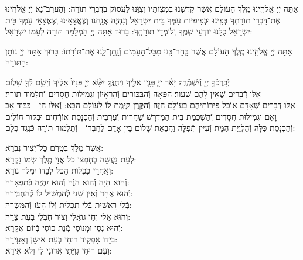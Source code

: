 \documentclass[twoside, openany, parskip=half, 11pt]{book}
\begin{document}
אַתָּה יְיָ אֱלֹהֵֽינוּ מֶֽלֶךְ הָעוֹלָם אֲשֶׁר קִדְּֿשָֽֿׁנוּ בְּֿמִצְוֹתָיו וְֿצִוָּֽנוּ לַעֲסוֹק בְּֿדִבְרֵי תוֹרָה: וְֿהַעֲרֶב־נָא יְיָ אֱלֹהֵֽינוּ אֶת־דִּבְרֵי תוֹרָתְֿךָ בְּֿפִֽינוּ וּבְפִיפִיּוֹת עַמְּֿךָ בֵּית יִשְׂרָאֵל וְֿנִהְיֶה אֲנַֽחְנוּ וְֿצֶאֱצָאֵֽינוּ וְֿצֶאֱצָאֵי עַמְּֿךָ בֵּית יִשְׂרָאֵל כֻּלָּֽנוּ יוֹדְֿעֵי שְֿׁמֶֽךָ וְֿלוֹמְֿדֵי תוֹרָתֶֽךָ: בָּרוּךְ אַתָּה יְיָ הַמְֿלַמֵּד תּוֹרָה לְֿעַמּוֹ יִשְׂרָאֵל:

אַתָּה יְיָ אֱלֹהֵֽינוּ מֶֽלֶךְ הָעוֹלָם אֲשֶׁר בָּֽחַר־בָּֽנוּ מִכׇּל־הָעַמִּים וְֿנָֽתַן־לָֽנוּ אֶת־תּוֹרָתוֹ: בָּרוּךְ אַתָּה יְיָ נוֹתֵן הַתּוֹרָה:



יְֿבָֽרֶכְֿךָ֥ יְיָ֖ וְֿיִשְׁמְֿרֶֽךָ׃ יָאֵ֨ר יְיָ֧ פָּנָ֛יו אֵלֶ֖יךָ וִֽיחֻנֶּֽךָּ׃ יִשָּׂ֨א יְיָ֤ פָּנָיו֙ אֵלֶ֔יךָ וְֿיָשֵׂ֥ם לְֿךָ֖ שָׁלֽוֹם׃\\
אֵֽלּוּ דְֿבָרִים שֶׁאֵין לָהֶם שִׁעוּר׃ הַפֵּאָה וְֿהַבִּכּוּרִים וְֿהָרֵאָיוֹן וּגְמִילוּת חֲסָדִים וְֿתַלְמוּד תּוֹרָה׃\\
אֵֽלּוּ דְבָרִים שֶׁאָדָם אוֹכֵל פֵּירוֹתֵיהֶם בָּעוֹלָם הַזֶּה וְֿהַקֶּֽרֶן קַיֶּֽמֶת לוֹ לָעוֹלָם הַבָּא: וְֿאֵֽלּוּ הֵן - כִּבּוּד אָב וָאֵם וּגְמִילוּת חֲסָדִים וְֿהַשְׁכָּמַת בֵּית הַמִּדְרָשׁ שַׁחֲרִית וְֿעַרְבִית וְֿהַכְנָסַת אוֹרְֿחִים וּבִקּוּר חוֹלִים וְֿהַכְנָסַת כַּלָּה וְֿהַלְוָיַת הַמֵּת וְֿעִיּוּן תְּֿפִלָּה וַהֲבָאַת שָׁלוֹם בֵּין אָדָם לַחֲבֵרוֹ - וְֿתַלְמוּד תּוֹרָה כְּֿנֶֽגֶד כֻּלָּם:




\newcommand{\adonolam}{

\firstword{אֲדוֹן עוֹלָם}
אֲשֶׁר מָלַךְ \hfill בְּֿטֶֽרֶם כׇּל־יְֿצִיר נִבְרָא: \\
לְֿעֵת נַעֲשָׂה בְֿחֶפְצוֹ כֹּל \hfill אֲזַי מֶֽלֶךְ שְֿׁמוֹ נִקְרָא:\\
וְֿאַֽחֲרֵי כִּכְלוֹת הַכֹּל \hfill לְֿבַדּוֹ יִמְלֹךְ נוֹרָא: \\
וְֿהוּא הָיָה וְֿהוּא הוֶֹה \hfill וְֿהוּא יִהְיֶה בְּֿתִפְאָרָה: \\
וְֿהוּא אֶחָד וְֿאֵין שֵׁנִי \hfill לְֿהַמְשִׁיל לוֹ לְֿהַחְבִּֽירָה: \\
בְּֿלִי רֵאשִׁית בְּֿלִי תַכְלִית \hfill וְֿלוֹ הָעֹז וְֿהַמִּשְׂרָה: \\
וְֿהוּא אֵלִי וְֿחַי גוֹאֲלִי \hfill וְֿצוּר חֶבְלִי בְּֿעֵת צָרָה: \\
וְֿהוּא נִסִּי וּמָנוֹסִי \hfill מְֿנָת כּוֹסִי בְּֿיוֹם אֶקְרָא: \\
בְּֿיָדוֹ אַפְקִיד רוּחִי \hfill בְּֿעֵת אִישַׁן וְֿאָעִֽירָה: \\
וְֿעִם רוּחִי גְּֿוִיָּתִי \hfill אֲדוֹנָי לִי וְֿלֹא אִירָא:
}
\adonolam
\end{document}
